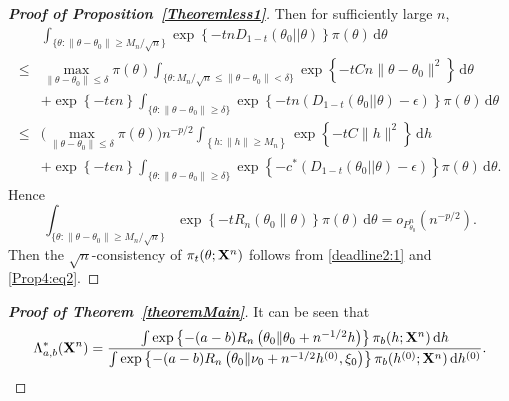 \documentclass[11pt]{article}
\theoremstyle{plain}
\theoremstyle{definition}
\theoremstyle{remark}
\begin{document}
\begin{appendices}
\begin{proof}[\textbf{Proof of Proposition~\ref{Theoremless1}}]
    Then for sufficiently large $n$,
\begin{align*}
    &
    \int_{\{\theta:\|\theta-\theta_0\|\geq {M_n}/{\sqrt{n}}\} } 
    \exp \left\{  - t n D_{1-t}(\theta_0||\theta)  \right\} \pi(\theta) \, \mathrm d \theta
    \\
    \leq &
    \max_{\|\theta-\theta_0\|\leq \delta}\pi(\theta)
    \int_{\big\{\theta: {M_n}/{\sqrt{n}} \leq \|\theta-\theta_0\| < \delta \big\}}
\exp\left\{  -t C {n} \|\theta-\theta_0\|^2 \right\}
    \, \mathrm d \theta
    \\
    &+
    \exp\left\{ -t\epsilon n\right\}
    \int_{\{\theta:\|\theta-\theta_0\|\geq \delta \} } 
    \exp \left\{  - t n ( D_{1-t}(\theta_0||\theta)  - \epsilon ) \right\} \pi(\theta) \, \mathrm d \theta
    \\
    \leq&
    \big(\max_{\|\theta-\theta_0\|\leq \delta}\pi(\theta)\big)
    n^{-p/2}\int_{ \left\{ h: \|h\| \geq M_n \right\}} \exp\left\{  - t C \|h\|^2 \right\} \, \mathrm d h
    \\
    &+
    \exp\left\{ -t\epsilon n\right\}
    \int_{\{\theta:\|\theta-\theta_0\|\geq \delta \} } 
    \exp \left\{  - c^* ( D_{1-t}(\theta_0||\theta)  - \epsilon ) \right\} \pi(\theta) \, \mathrm d \theta
    .
\end{align*}
Hence
\begin{equation}\label{Prop4:eq2}
    \int_{\{\theta:\|\theta-\theta_0\|\geq {M_n}/{\sqrt{n}}\} } 
    \exp\left\{ -t R_n \left( \theta_0 \| \theta \right) \right\}
    \pi(\theta) \, \mathrm d \theta
    =o_{P^n_{\theta_0}}\left( n^{-p/2} \right).
\end{equation}
Then the $\sqrt{n}$-consistency of $\pi_t(\theta;\mathbf{X}^{n})$ follows from \eqref{deadline2:1} and \eqref{Prop4:eq2}.





\end{proof}










\begin{proof}[\textbf{Proof of Theorem~\ref{theoremMain}}]
    It can be seen that
    \begin{equation*}
        \Lambda_{a,b}^* (\mathbf{X}^n)=\frac{
            \int \exp\left\{ - (a-b) R_n \left( \theta_0 \| \theta_0 + n^{-1/2} h \right) \right\} \pi_b (h;\mathbf{X}^{n}) \, \mathrm dh
        }{
            \int \exp\left\{ - (a-b) R_n \left( \theta_0 \| \nu_0 + n^{-1/2} h^{(0)}, \xi_0 \right) \right\} \pi_b (h^{(0)};\mathbf{X}^{n}) \, \mathrm dh^{(0)}
}.
    \end{equation*}



\end{proof}
\end{appendices}
\end{document}
